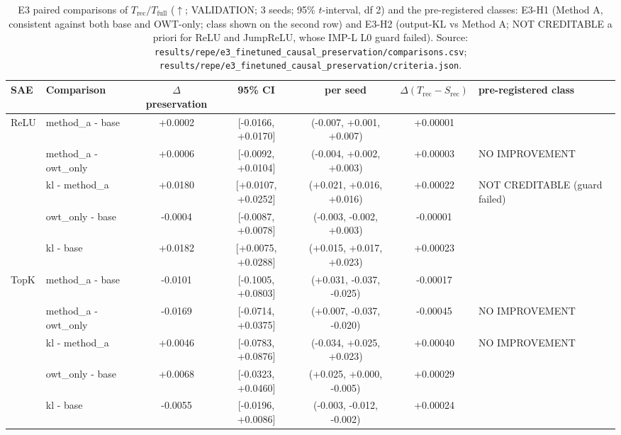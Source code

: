 \begin{table}[t]
\centering
\small
\caption{E3 paired comparisons of $T_{\text{rec}}/T_{\text{full}}$ ($\uparrow$; VALIDATION; 3 seeds; 95\% $t$-interval, df 2) and the pre-registered classes: E3-H1 (Method A, consistent against both base and OWT-only; class shown on the second row) and E3-H2 (output-KL vs Method A; NOT CREDITABLE a priori for ReLU and JumpReLU, whose IMP-L L0 guard failed). Source: \texttt{results/\allowbreak{}repe/\allowbreak{}e3\_finetuned\_causal\_preservation/\allowbreak{}comparisons.csv}; \texttt{results/\allowbreak{}repe/\allowbreak{}e3\_finetuned\_causal\_preservation/\allowbreak{}criteria.json}.}
\label{tab:e3_classes}
\begin{adjustbox}{max width=\linewidth}
\begin{tabular}{llccccl}
\toprule
SAE & Comparison & $\Delta$ preservation & 95\% CI & per seed & $\Delta(T_{\text{rec}}-S_{\text{rec}})$ & pre-registered class \\
\midrule
ReLU & method\_a - base & +0.0002 & [-0.0166, +0.0170] & (-0.007, +0.001, +0.007) & +0.00001 &  \\
 & method\_a - owt\_only & +0.0006 & [-0.0092, +0.0104] & (-0.004, +0.002, +0.003) & +0.00003 & NO IMPROVEMENT \\
 & kl - method\_a & +0.0180 & [+0.0107, +0.0252] & (+0.021, +0.016, +0.016) & +0.00022 & NOT CREDITABLE (guard failed) \\
 & owt\_only - base & -0.0004 & [-0.0087, +0.0078] & (-0.003, -0.002, +0.003) & -0.00001 &  \\
 & kl - base & +0.0182 & [+0.0075, +0.0288] & (+0.015, +0.017, +0.023) & +0.00023 &  \\
\midrule
TopK & method\_a - base & -0.0101 & [-0.1005, +0.0803] & (+0.031, -0.037, -0.025) & -0.00017 &  \\
 & method\_a - owt\_only & -0.0169 & [-0.0714, +0.0375] & (+0.007, -0.037, -0.020) & -0.00045 & NO IMPROVEMENT \\
 & kl - method\_a & +0.0046 & [-0.0783, +0.0876] & (-0.034, +0.025, +0.023) & +0.00040 & NO IMPROVEMENT \\
 & owt\_only - base & +0.0068 & [-0.0323, +0.0460] & (+0.025, +0.000, -0.005) & +0.00029 &  \\
 & kl - base & -0.0055 & [-0.0196, +0.0086] & (-0.003, -0.012, -0.002) & +0.00024 &  \\

\end{tabular}
\end{adjustbox}
\end{table}
